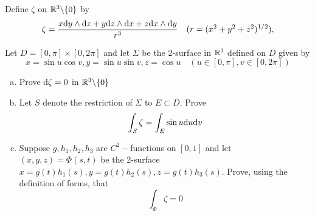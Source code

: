\documentclass[a4paper, 12pt]{article}
\begin{document}
\begin{problem} 
Define $\zeta$ on $\mathbb{R}^3 \backslash \{0\}$ by \begin{equation*}
\zeta = \frac{x \mathrm{d} y \wedge \mathrm{d} z + y \mathrm{d} z \wedge \mathrm{d} x + z \mathrm{d} x \wedge \mathrm{d} y}{r^3} \quad (r = (x^2 + y^2 + z^2)^{1/2}),
\end{equation*}

Let $D = [0, \pi] \times [0, 2\pi]$ and let $\Sigma$ be the 2-surface in $\mathbb{R}^3$ defined on $D$ given by \begin{equation*}
x = \sin u \cos v, y = \sin u \sin v, z = \cos u \quad (u \in [0, \pi], v \in [0, 2\pi])
\end{equation*}

\begin{enumerate} [(a)]
\item Prove $\mathrm{d} \zeta = 0$ in $\mathbb{R}^3 \backslash \{0\}$
\item Let $S$ denote the restriction of $\Sigma$ to $E \subset D$. Prove \begin{equation*}
\int_S \zeta = \int_E \sin u \mathrm{d} u \mathrm{d} v
\end{equation*}
\item Suppose $g, h_1, h_2, h_3$ are $C^2-$functions on $[0, 1]$ and let $(x, y, z) = \Phi(s, t)$ be the 2-surface $x = g(t)h_1(s), y = g(t) h_2(s), z = g(t) h_3(s)$. Prove, using the definition of forms, that \begin{equation*}
\int_{\Phi} \zeta = 0
\end{equation*}
\end{enumerate}
\end{problem}
\end{document}
